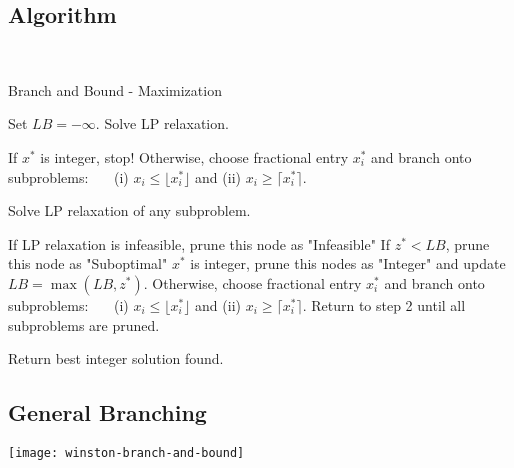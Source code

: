 \documentclass[../open-optimization/open-optimization.tex]{subfiles}
\begin{document}
\subsection{Algorithm}


\begin{algorithm}[H]
\\
\caption{Branch and Bound - Maximization}\label{alg:branch-and-bound-max}
\begin{algorithmic}[1]
	\State Set $LB = - \infty$.
 	\State Solve LP relaxation. 
	\begin{algsubstates}
        		\State If $x^*$ is integer, stop!
        		\State Otherwise, choose fractional entry $x_i^*$ and branch onto subproblems:\ \ \ \hspace{3cm}  (i) $x_i \leq \lfloor x^*_i \rfloor$ and (ii) $x_i \geq \lceil x^*_i \rceil$.        \end{algsubstates}
	\State Solve LP relaxation of any subproblem.
		\begin{algsubstates}
		\State If LP relaxation is infeasible, prune this node as "Infeasible"
        		\State If $z^* < LB$, prune this node as "Suboptimal"
		\State $x^*$ is integer, prune this nodes as "Integer" and update $LB = \max(LB, z^*)$.
		\State Otherwise, choose fractional entry $x_i^*$ and branch onto subproblems:\ \ \ \hspace{3cm}  (i) $x_i \leq \lfloor x^*_i \rfloor$ and (ii) $x_i \geq \lceil x^*_i \rceil$.     Return to step 2 until all subproblems are pruned.
      \end{algsubstates}
      \State Return best integer solution found.
	\end{algorithmic}
\end{algorithm}

%
%
%




\subsection{General Branching}

\newpage

\texttt{[image: winston-branch-and-bound]}
\end{document}
